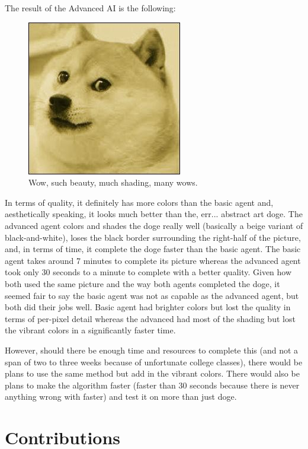 \documentclass[11pt]{article}
\begin{document}
The result of the Advanced AI is the following:

\begin{figure}[h]
\centering
\includegraphics[scale=0.70]{images/advanced.jpg}
\caption{Wow, such beauty, much shading, many wows.}
\end{figure}

In terms of quality, it definitely has more colors than the basic agent and, aesthetically speaking, it looks much better than the, err... abstract art doge. The advanced agent colors and shades the doge really well (basically a beige variant of black-and-white), loses the black border surrounding the right-half of the picture, and, in terms of time, it complete the doge faster than the basic agent. The basic agent takes around 7 minutes to complete its picture whereas the advanced agent took only 30 seconds to a minute to complete with a better quality. Given how both used the same picture and the way both agents completed the doge, it seemed fair to say the basic agent was not as capable as the advanced agent, but both did their jobs well. Basic agent had brighter colors but lost the quality in terms of per-pixel detail whereas the advanced had most of the shading but lost the vibrant colors in a significantly faster time.

However, should there be enough time and resources to complete this (and not a span of two to three weeks because of unfortunate college classes), there would be plans to use the same method but add in the vibrant colors. There would also be plans to make the algorithm faster (faster than 30 seconds because there is never anything wrong with faster) and test it on more than just doge.

\section{Contributions}
\end{document}

